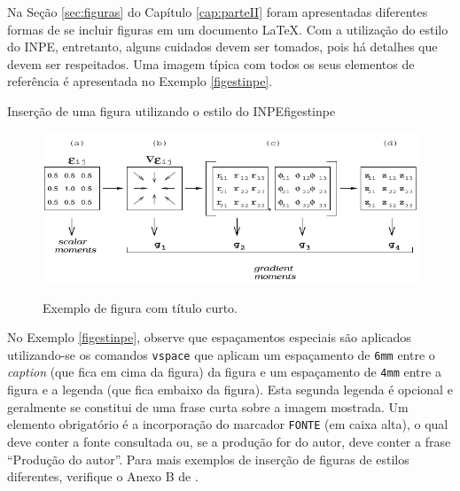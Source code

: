 Na Seção \ref{sec:figuras} do Capítulo \ref{cap:parteII} foram apresentadas diferentes formas de se incluir figuras em um documento \LaTeX{}. Com a utilização do estilo do INPE, entretanto, alguns cuidados devem ser tomados, pois há detalhes que devem ser respeitados. Uma imagem típica com todos os seus elementos de referência é apresentada no Exemplo \ref{figestinpe}.

\begin{texexptitled}[breakable,center lower,enhanced,middle=2mm,listing and text]{Inserção de uma figura utilizando o estilo do INPE}{figestinpe}
\begin{figure}[H]
  \caption{Exemplo de figura com título curto.}
  \vspace{6mm} %
  \begin{center}
    \includegraphics[width=12cm]{./docs/figs/gpa.pdf}  
  \end{center}
  \vspace{4mm} %
  \label{figgpa1}
\end{figure}
\end{texexptitled}

No Exemplo \ref{figestinpe}, observe que espaçamentos especiais são aplicados utilizando-se os comandos {\tt vspace} que aplicam um espaçamento de {\tt 6mm} entre o \textit{caption} (que fica em cima da figura) da figura e um espaçamento de {\tt 4mm} entre a figura e a legenda (que fica embaixo da figura). Esta segunda legenda é opcional e geralmente se constitui de uma frase curta sobre a imagem mostrada. Um elemento obrigatório é a incorporação do marcador {\tt FONTE} (em caixa alta), o qual deve conter a fonte consultada ou, se a produção for do autor, deve conter a frase ``Produção do autor''. Para mais exemplos de inserção de figuras de estilos diferentes, verifique o Anexo B de .

